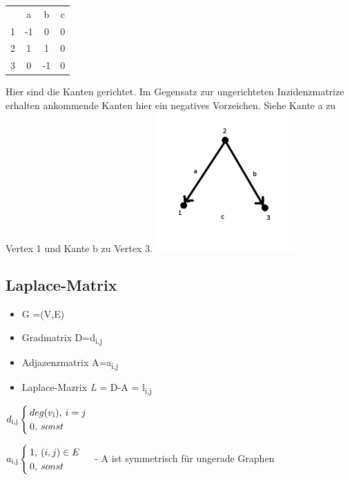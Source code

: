 \begin{tabular}{cccc}
 & a & b & c \\
1 & -1 & 0 & 0 \\
2 & 1 & 1 & 0 \\
3 & 0 & -1 & 0 \\
\end{tabular}\newline\newline
Hier sind die Kanten gerichtet. Im Gegensatz zur ungerichteten Inzidenzmatrize erhalten \glqq ankommende\grqq{} Kanten hier ein negatives Vorzeichen. Siehe Kante a zu Vertex 1 und Kante b zu Vertex 3.\newline
\includegraphics[width=0.4\textwidth]{lectures/161028/pix/dreieckge.png}

\newpage

\subsection{Laplace-Matrix}
\begin{itemize}
	\item G =(V,E)
	\item Gradmatrix D=d\textsubscript{i,j}
	\item Adjazenzmatrix A=a\textsubscript{i,j}
	\item Laplace-Mazrix \textit L = D-A = l\textsubscript{i,j}
\end{itemize}

$d\textsubscript{i,j}\begin{cases}deg(v\textsubscript{i}),\>i=j\\0,\>sonst\end{cases}$\newline\newline

$a\textsubscript{i,j}\begin{cases}1,\>(i,j)\in E\\0,\>sonst\end{cases}$\newline\newline
- A ist symmetrisch für ungerade Graphen\newline

